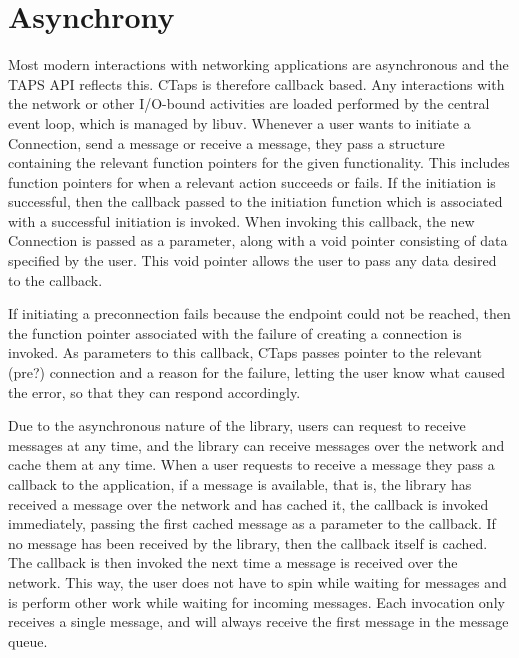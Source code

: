 \section{Asynchrony} \label{asynchrony}
Most modern interactions with networking applications are asynchronous
and the TAPS API reflects this. CTaps is therefore callback based. Any
interactions with the network or other I/O-bound activities are loaded
performed by the central event loop, which is managed by libuv. Whenever
a user wants to initiate a Connection, send a message or receive a message,
they pass a structure containing the relevant function pointers for the given
functionality. 
This includes function pointers for when a relevant action succeeds or fails.
If the initiation is successful, then the callback passed to the initiation
function which is associated with a successful initiation is invoked. 
When invoking this callback, the new Connection is passed as a parameter,
along with a void pointer consisting of data specified by the user.
This void pointer allows the user to pass any data desired to the callback.

If initiating a preconnection fails because the endpoint could not be
reached, then the function pointer associated with the failure of creating
a connection is invoked. 
As parameters to this callback, CTaps passes pointer to the relevant (pre?) connection 
and a reason for the failure, letting the user know what caused the error,
so that they can respond accordingly.

Due to the asynchronous nature of the library, users can request to
receive messages at any time, and the library can receive messages
over the network and cache them at any time. When a user requests
to receive a message they pass a callback to the application, if a
message is available, that is, the library has received a message
over the network and has cached it, the callback is invoked immediately,
passing the first cached message as a parameter to the callback.
If no message has been received by the library, then the callback
itself is cached. The callback is then invoked the next time a message
is received over the network. This way, the user does not have to
spin while waiting for messages and is perform other work while
waiting for incoming messages. Each invocation only receives
a single message, and will always receive the first message in
the message queue.

